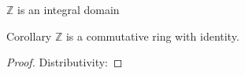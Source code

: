 \documentclass[aspectratio=169]{beamer}
\begin{document}
\begin{frame}{$\mathbb{Z}$ is an integral domain}
    \begin{block}{Corollary}
        $\mathbb{Z}$ is a commutative ring with identity.
    \end{block}

    \begin{proof}
        Distributivity:
    \end{proof}

    
\end{frame}
\end{document}
